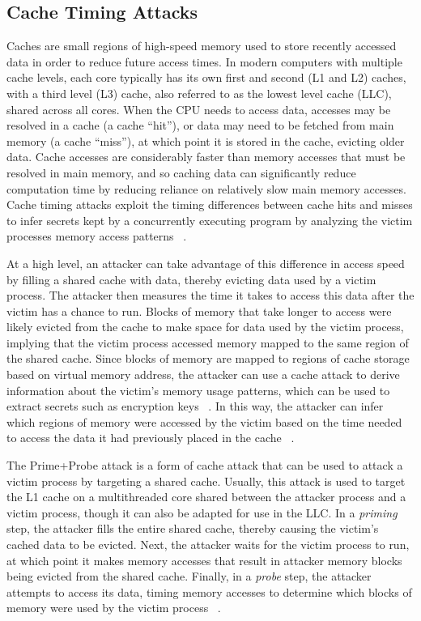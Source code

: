 \subsection{Cache Timing Attacks}

Caches are small regions of high-speed memory used to store recently accessed data in order to reduce future access times. In modern computers with multiple cache levels, each core typically has its own first and second (L1 and L2) caches, with a third level (L3) cache, also referred to as the lowest level cache (LLC), shared across all cores. When the CPU needs to access data, accesses may be resolved in a cache (a cache ``hit''), or data may need to be fetched from main memory (a cache ``miss''), at which point it is stored in the cache, evicting older data. Cache accesses are considerably faster than memory accesses that must be resolved in main memory, and so caching data can significantly reduce computation time by reducing reliance on relatively slow main memory accesses. Cache timing attacks exploit the timing differences between cache hits and misses to infer secrets kept by a concurrently executing program by analyzing the victim processes memory access patterns ~\cite{costan_intel_2016, moghimi_cachezoom:_2017}.  

At a high level, an attacker can take advantage of this difference in access speed by filling a shared cache with data, thereby evicting data used by a victim process. The attacker then measures the time it takes to access this data after the victim has a chance to run. Blocks of memory that take longer to access were likely evicted from the cache to make space for data used by the victim process, implying that the victim process accessed memory mapped to the same region of the shared cache. Since blocks of memory are mapped to regions of cache storage based on virtual memory address, the attacker can use a cache attack to derive information about the victim's memory usage patterns, which can be used to extract secrets such as encryption keys ~\cite{liu_cache-timing_2013}. In this way, the attacker can infer which regions of memory were accessed by the victim based on the time needed to access the data it had previously placed in the cache ~\cite{moghimi_cachezoom:_2017, gotzfried_cache_2017}.

The Prime+Probe attack is a form of cache attack that can be used to attack a victim process by targeting a shared cache. Usually, this attack is used to target the L1 cache on a multithreaded core shared between the attacker process and a victim process, though it can also be adapted for use in the LLC. In a \emph{priming} step, the attacker fills the entire shared cache, thereby causing the victim's cached data to be evicted. Next, the attacker waits for the victim process to run, at which point it makes memory accesses that result in attacker memory blocks being evicted from the shared cache. Finally, in a \emph{probe} step, the attacker attempts to access its data, timing memory accesses to determine which blocks of memory were used by the victim process ~\cite{moghimi_cachezoom:_2017, gotzfried_cache_2017}.


